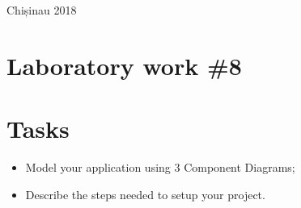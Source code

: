 \documentclass[12pt,a4paper,titlepage]{article}
\begin{document}
\begin{titlepage}
\begin{center}
      \vspace{5 mm}


      {\large Chișinau 2018}\\[3cm] %




      \vfill %
      \end{center}
      
\end{titlepage}

\cleardoublepage

\newpage

\setcounter{page}{1}
\setcounter{secnumdepth}{4}

\cleardoublepage


{}
\section*{Laboratory work \#8}

\section{Tasks}
\begin{itemize}
	\item
	Model your application using 3 Component Diagrams;
	\item 
	Describe the steps needed to setup your project.
\end{itemize}
\end{document}

